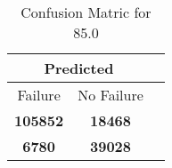 \begin{table}[] 
\label{Table: Prediction Accuracy-DMD85.0OnlySunEKF-resetReflection-Reflection} 
\caption{Confusion Matric for 85.0} 
\centering 
\begin{tabular} 
 {@{}ccc@{}} 
\toprule 
\multicolumn{2}{c}{\textbf{Predicted}}
 \\ \midrule 
\multicolumn{1}{|c|}{Failure} & 
\multicolumn{1}{c|}{No Failure}
 \\ \midrule 
\multicolumn{1}{|c|}{\color{green}\textbf{105852}} & 
\multicolumn{1}{c|}{\color{red}\textbf{18468}}
 \\ \midrule 
\multicolumn{1}{|c|}{\color{red}\textbf{6780}} & 
\multicolumn{1}{c|}{\color{green}\textbf{39028}}
 \\ \bottomrule 
\end{tabular} 
\end{table} 
